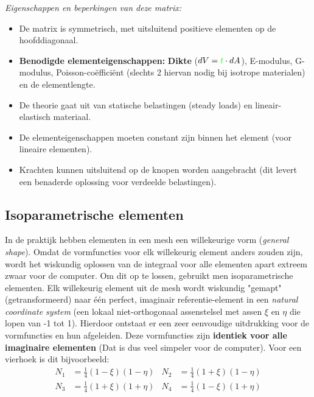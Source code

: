 \documentclass[a4paper,11pt,twoside]{report}
\begin{document}
\textit{Eigenschappen en beperkingen van deze matrix:}
\begin{itemize}
    \item De matrix is symmetrisch, met uitsluitend positieve elementen op de hoofddiagonaal.
    \item \textbf{Benodigde elementeigenschappen:} {\color{green}\textbf{Dikte}}
          ($dV = {\color{green}t} \cdot dA$), E-modulus, G-modulus, Poisson-coëfficiënt (slechts 2 hiervan
          nodig bij isotrope materialen) en de elementlengte.
    \item De theorie gaat uit van statische belastingen (steady loads) en lineair-elastisch
          materiaal.
    \item De elementeigenschappen moeten constant zijn binnen het element (voor lineaire elementen).
    \item Krachten kunnen uitsluitend op de knopen worden aangebracht (dit levert een benaderde
          oplossing voor verdeelde belastingen).
\end{itemize}
\subsection{Isoparametrische elementen}
In de praktijk hebben elementen in een mesh een willekeurige vorm (\textit{general shape}). Omdat de
vormfuncties voor elk willekeurig element anders zouden zijn, wordt het wiskundig oplossen van de
integraal voor alle elementen apart extreem zwaar voor de computer.
\newline
\newline
Om dit op te lossen, gebruikt men isoparametrische elementen. Elk willekeurig element uit de mesh
wordt wiskundig "gemapt" (getransformeerd) naar één perfect, imaginair referentie-element in een
\textit{natural coordinate system} (een lokaal niet-orthogonaal assenstelsel met assen $\xi$ en
$\eta$ die lopen van -1 tot 1).
\newline
\newline
Hierdoor ontstaat er een zeer eenvoudige uitdrukking voor de vormfuncties en hun afgeleiden. Deze
vormfuncties zijn \textbf{identiek voor alle imaginaire elementen} (Dat is dus veel simpeler voor de
computer). Voor een vierhoek is dit bijvoorbeeld:
\begin{align*}
    N_1 & = \frac{1}{4}(1-\xi)(1-\eta) & N_2 & = \frac{1}{4}(1+\xi)(1-\eta) \\
    N_3 & = \frac{1}{4}(1+\xi)(1+\eta) & N_4 & = \frac{1}{4}(1-\xi)(1+\eta)
\end{align*}
\end{document}
